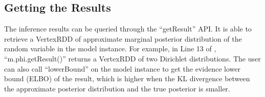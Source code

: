 
\subsection{Getting the Results}
The inference results can be queried through the ``{\sf getResult}''
API.   It is able to retrieve a VertexRDD of approximate
marginal posterior distribution of the random variable 
in the model instance. For example, in Line 13 of 
, ``{\sf m.phi.getResult()}'' 
returns a VertexRDD of two Dirichlet distributions. 
The user can also call ``{\sf lowerBound}'' 
on the model instance to get the evidence lower bound (ELBO) of the result, 
which is higher when the KL divergence between the approximate posterior 
distribution and the true posterior is smaller. 

